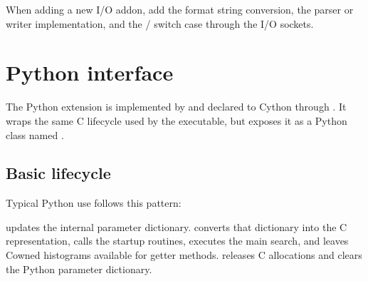 \documentclass[letterpaper,10pt,english]{sphinxmanual}
\begin{document}
\sphinxAtStartPar
When adding a new I/O add\sphinxhyphen{}on, add the format string conversion, the parser or
writer implementation, and the / switch case through
the I/O sockets.

\sphinxstepscope


\chapter{Python interface}
\label{\detokenize{python:python-interface}}\label{\detokenize{python::doc}}
\sphinxAtStartPar
The Python extension is implemented by  and declared to
Cython through . It wraps the same C lifecycle used by the
 executable, but exposes it as a Python class named .


\section{Basic lifecycle}
\label{\detokenize{python:basic-lifecycle}}
\sphinxAtStartPar
Typical Python use follows this pattern:

\begin{sphinxVerbatim}[commandchars=\\\{\}]
 

  
  
  
\end{sphinxVerbatim}

\sphinxAtStartPar
{} updates the internal parameter dictionary.  converts that
dictionary into the C  representation, calls the startup
routines, executes the main search, and leaves C\sphinxhyphen{}owned histograms available for
getter methods.  releases C allocations and clears the Python
parameter dictionary.
\end{document}
